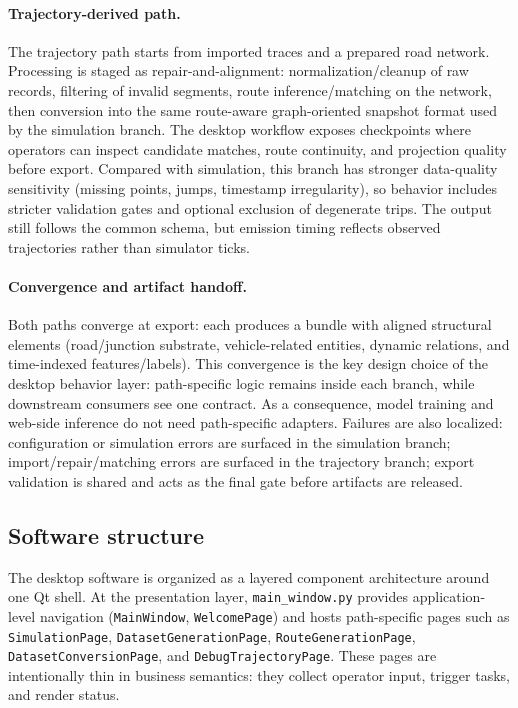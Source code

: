 \paragraph{Trajectory-derived path.}
The trajectory path starts from imported traces and a prepared road network. Processing is staged as repair-and-alignment: normalization/cleanup of raw records, filtering of invalid segments, route inference/matching on the network, then conversion into the same route-aware graph-oriented snapshot format used by the simulation branch. The desktop workflow exposes checkpoints where operators can inspect candidate matches, route continuity, and projection quality before export. Compared with simulation, this branch has stronger data-quality sensitivity (missing points, jumps, timestamp irregularity), so behavior includes stricter validation gates and optional exclusion of degenerate trips. The output still follows the common schema, but emission timing reflects observed trajectories rather than simulator ticks.

\paragraph{Convergence and artifact handoff.}
Both paths converge at export: each produces a bundle with aligned structural elements (road/junction substrate, vehicle-related entities, dynamic relations, and time-indexed features/labels). This convergence is the key design choice of the desktop behavior layer: path-specific logic remains inside each branch, while downstream consumers see one contract. As a consequence, model training and web-side inference do not need path-specific adapters. Failures are also localized: configuration or simulation errors are surfaced in the simulation branch; import/repair/matching errors are surfaced in the trajectory branch; export validation is shared and acts as the final gate before artifacts are released.

\subsection{Software structure}\label{sec:system:desktop:structure}
\begin{sloppypar}
The desktop software is organized as a layered component architecture around one Qt shell. At the presentation layer, \texttt{main\_window.py} provides application-level navigation (\texttt{MainWindow}, \texttt{WelcomePage}) and hosts path-specific pages such as \texttt{SimulationPage}, \texttt{DatasetGenerationPage}, \texttt{RouteGenerationPage}, \texttt{DatasetConversionPage}, and \texttt{DebugTrajectoryPage}. These pages are intentionally thin in business semantics: they collect operator input, trigger tasks, and render status.
\end{sloppypar}

